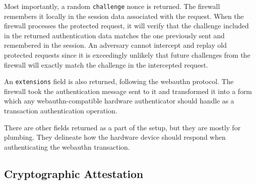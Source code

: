 

Most importantly, a random \lstinline{challenge} nonce is returned. The firewall remembers it locally in the session data associated with the request. When the firewall processes the protected request, it will verify that the challenge included in the returned authentication data matches the one previously sent and remembered in the session. An adversary cannot intercept and replay old protected requests since it is exceedingly unlikely that future challenges from the firewall will exactly match the challenge in the intercepted request. 

An \lstinline{extensions} field is also returned, following the webauthn protocol. The firewall took the authentication message sent to it and transformed it into a form which any webauthn-compatible hardware authenticator should handle as a transaction authentication operation.

There are other fields returned as a part of the setup, but they are mostly for plumbing. They delineate how the hardware device should respond when authenticating the webauthn transaction.


\subsection{Cryptographic Attestation}

